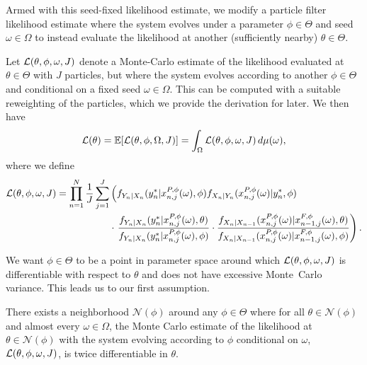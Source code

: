 \documentclass{article}
\begin{document}
Armed with this seed-fixed likelihood estimate, we modify a particle filter likelihood estimate where the system evolves under a parameter $\phi \in \Theta$ and seed $\omega \in \Omega$ to instead evaluate the likelihood at another (sufficiently nearby) $\theta \in \Theta.$ 

\begin{defn}
\label{defn:doubly-off-policy}
Let $\mathcal{L}(\theta, \phi, \omega, J)$ denote a Monte-Carlo estimate of the likelihood evaluated at $\theta \in \Theta$ with $J$ particles, but where the system evolves according to another $\phi \in \Theta$ and conditional on a fixed seed $\omega \in \Omega$. This can be computed with a suitable reweighting of the particles, which we provide the derivation for later. We then have
\begin{equation} \label{eq:loglik2}
\mathcal{L}(\theta)=\mathbb{E}[\mathcal{L}(\theta,\phi,\Omega, J)]=\int_\Omega \mathcal{L}(\theta,\phi,\omega, J)\, d\mu(\omega),
\end{equation}
where we define
\begin{align}
    \mathcal{L}(\theta,\phi,\omega, J) = \prod_{n=1}^N \frac{1}{J} \sum_{j=1}^J &\left(f_{Y_n|X_n}(y_n^* | x_{n,j}^{P,\phi}(\omega), \phi) f_{X_n|Y_n}(x_{n,j}^{P, \phi}(\omega) | y_n^*, \phi) \right.\\
    &\cdot
    \left.
    \frac{f_{Y_n|X_n}(y^*_n|x_{n,j}^{P,\phi}(\omega),\theta)}{f_{Y_n|X_n}(y^*_n|x_{n,j}^{P,\phi}(\omega),\phi)}
    \cdot \frac{f_{X_n|X_{n-1}}(x_{n,j}^{P,\phi}(\omega)|x_{n-1,j}^{F,\phi}(\omega),\theta)}{f_{X_n|X_{n-1}}(x_{n,j}^{P,\phi}(\omega)|x_{n-1,j}^{F,\phi}(\omega),\phi)}\right).
\end{align}
\end{defn}

We want $\phi\in\Theta$ to be a point in parameter space around which $\mathcal{L}(\theta,\phi,\omega, J)$ is differentiable with respect to $\theta$ and does not have excessive Monte~Carlo variance. This leads us to our first assumption.

\begin{aspt}
\label{assump:smooth-nbhd}
There exists a neighborhood $\mathcal{N}(\phi)$ around any $\phi \in \Theta$ where for all $\theta \in \mathcal{N}(\phi)$ and almost every $\omega \in \Omega$, the Monte Carlo estimate of the likelihood at $\theta \in \mathcal{N}(\phi)$ with the system evolving according to $\phi$ conditional on $\omega$, $\mathcal{L}(\theta,\phi,\omega, J)$, is twice differentiable in $\theta$. 
\end{aspt}
\end{document}
